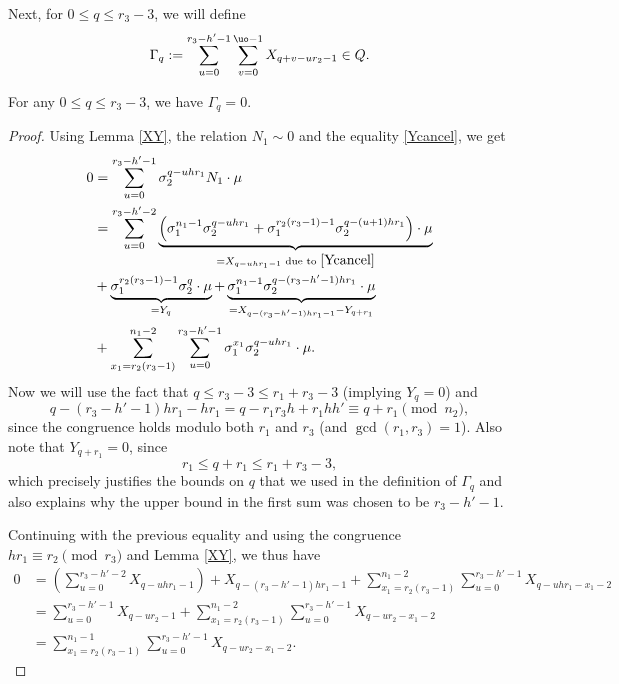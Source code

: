 Next, for $0\leq q \leq r_3-3$, we will define $$\Gamma_q:=\sum_{u=0}^{r_3-h'-1}\sum_{v=0}^{\uo-1}X_{q+v-ur_2-1}\in Q.$$

\begin{lemma}
For any $0\leq q \leq r_3-3$, we have $\Gamma_q=0$.
\end{lemma}
\begin{proof}
Using Lemma \ref{XY}, the relation $N_1\sim 0$ and the equality \eqref{Ycancel}, 
we get
\begin{align*}
0&= \sum_{u=0}^{r_3-h'-1} \sigma_2^{q-uhr_1}N_1\cdot \mu\\
&= \sum_{u=0}^{r_3-h'-2}  \underbrace{\left(\sigma_1^{n_1-1}\sigma_2^{q-uh r_1} +\sigma_1^{r_2(r_3-1)-1}\sigma_2^{q-(u+1)h r_1}\right)\cdot \mu}_{=X_{q-uhr_1-1} \text{ due to } \eqref{Ycancel}}\\
&+\underbrace{\sigma_1^{r_2(r_3-1)-1}\sigma_2^q\cdot \mu}_{=Y_q}+
\underbrace{\sigma_1^{n_1-1}\sigma_2^{q-(r_3-h'-1)h r_1}\cdot\mu}_{=X_{q-(r_3-h'-1)hr_1-1}-Y_{q+r_1}}\\
&+\sum_{x_1=r_2(r_3-1)}^{n_1-2}\sum_{u=0}^{r_3-h'-1} \sigma_1^{x_1}\sigma_2^{q-uh r_1}\cdot \mu.
\end{align*}
Now we will use the fact that $q\leq r_3-3\leq r_1+r_3-3$ (implying $Y_q=0$) and $$q-(r_3-h'-1)h r_1-hr_1=q-r_1r_3h+r_1hh'\equiv q+r_1\pmod{n_2},$$ since the congruence holds modulo both $r_1$ and $r_3$ (and $\gcd(r_1,r_3)=1$). Also note that $Y_{q+r_1}=0$, since
$$r_1\leq q+r_1\leq r_1+r_3-3,$$
which precisely justifies the bounds on $q$ that we used in the definition of $\Gamma_q$ and also explains why the upper bound in the first sum was chosen to be $r_3-h'-1$.

Continuing with the previous equality and using the congruence $hr_1\equiv r_2\pmod{r_3}$ and Lemma \ref{XY}, we thus have
\begin{align*}
0&= \left(\sum_{u=0}^{r_3-h'-2} X_{q-uhr_1-1}\right)+X_{q-(r_3-h'-1)hr_1-1}+\sum_{x_1=r_2(r_3-1)}^{n_1-2}\sum_{u=0}^{r_3-h'-1} X_{q-uh r_1-x_1-2}\\
&=\sum_{u=0}^{r_3-h'-1} X_{q-ur_2-1}+\sum_{x_1=r_2(r_3-1)}^{n_1-2}\sum_{u=0}^{r_3-h'-1} X_{q-ur_2-x_1-2}\\
&=\sum_{x_1=r_2(r_3-1)}^{n_1-1}\sum_{u=0}^{r_3-h'-1} X_{q-ur_2-x_1-2}.
\end{align*}


\end{proof}
